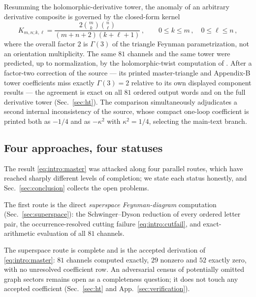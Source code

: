 Resumming the holomorphic-derivative tower, the anomaly of an arbitrary derivative composite is governed by the
closed-form kernel
\begin{equation}\label{eq:intro:kernel}
K_{m,n;k,\ell}=\frac{2\binom{m}{k}\binom{n}{\ell}}{(m+n+2)(k+\ell+1)}\,,
\qquad 0\le k\le m\,,\quad 0\le\ell\le n\,,
\end{equation}
where the overall factor $2$ is $\Gamma(3)$ of the triangle Feynman parametrization, not an orientation multiplicity. The
same $81$ channels and the same tower were predicted, up to normalization, by the holomorphic-twist computation of
\cite{BK}. After a factor-two correction of the source --- its printed master-triangle and Appendix-B tower coefficients
miss exactly $\Gamma(3)=2$ relative to its own displayed component results --- the agreement is exact on all $81$ ordered
output words and on the full derivative tower (Sec.~\ref{sec:ht}). The comparison simultaneously adjudicates a second
internal inconsistency of the source, whose compact one-loop coefficient is printed both as $-1/4$ and as $-\kappa^2$ with
$\kappa^2=1/4$, selecting the main-text branch.

\subsection{Four approaches, four statuses}

The result \eqref{eq:intro:master} was attacked along four parallel routes, which have reached sharply different levels of
completion; we state each status honestly, and Sec.~\ref{sec:conclusion} collects the open problems.

The first route is the direct \emph{superspace Feynman-diagram} computation (Sec.~\ref{sec:superspace}): the
Schwinger--Dyson reduction of every ordered letter pair, the occurrence-resolved cutting failure
\eqref{eq:intro:cutfail}, and exact-arithmetic evaluation of all $81$ channels.
\begin{remark}\label{rem:intro:superspace}
The superspace route is complete and is the accepted derivation of \eqref{eq:intro:master}: $81$ channels computed
exactly, $29$ nonzero and $52$ exactly zero, with no unresolved coefficient row. An adversarial census of potentially
omitted graph sectors remains open as a completeness question; it does not touch any accepted coefficient
(Sec.~\ref{sec:ht} and App.~\ref{sec:verification}).
\end{remark}

